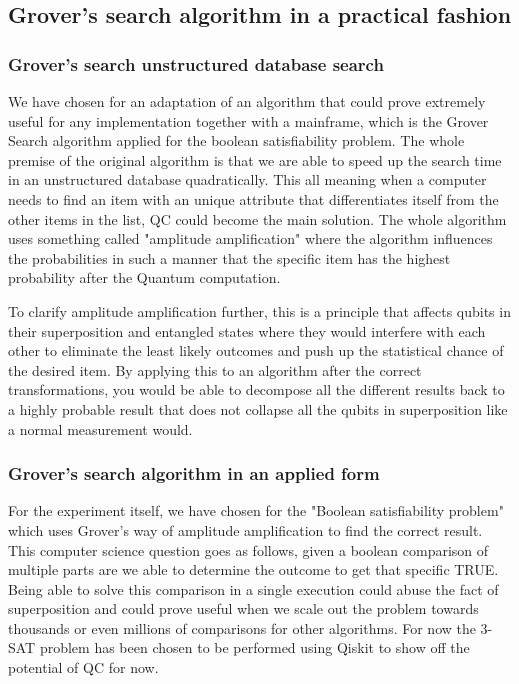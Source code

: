 \subsection{Grover's search algorithm in a practical fashion}
\subsubsection{Grover's search unstructured database search}

We have chosen for an adaptation of an algorithm that could prove extremely useful for any implementation together with a mainframe, which is the Grover Search algorithm applied for the boolean satisfiability problem. The whole premise of the original algorithm is that we are able to speed up the search time in an unstructured database quadratically. This all meaning when a computer needs to find an item with an unique attribute that differentiates itself from the other items in the list, QC could become the main solution. The whole algorithm uses something called "amplitude amplification" where the algorithm influences the probabilities in such a manner that the specific item has the highest probability after the Quantum computation. \autocite{Grover1996}

To clarify amplitude amplification further, this is a principle that affects qubits in their superposition and entangled states where they would interfere with each other to eliminate the least likely outcomes and push up the statistical chance of the desired item. By applying this to an algorithm after the correct transformations, you would be able to decompose all the different results back to a highly probable result that does not collapse all the qubits in superposition like a normal measurement would. 

\subsubsection{Grover's search algorithm in an applied form}

For the experiment itself, we have chosen for the "Boolean satisfiability problem" which uses Grover's way of amplitude amplification to find the correct result. This computer science question goes as follows, given a boolean comparison of multiple parts are we able to determine the outcome to get that specific TRUE. Being able to solve this comparison in a single execution could abuse the fact of superposition and could prove useful when we scale out the problem towards thousands or even millions of comparisons for other algorithms. For now the 3-SAT problem has been chosen to be performed using Qiskit to show off the potential of QC for now.

